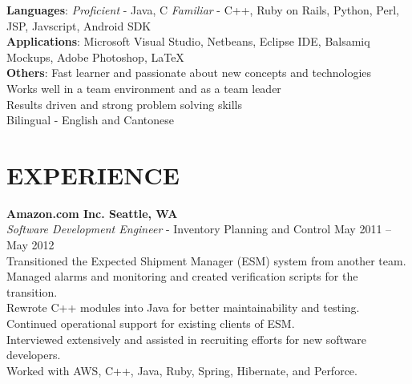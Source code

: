 \documentclass[margin,line]{resume}
\begin{document}
\begin{resume}
    \textbf{Languages}: \textsl{Proficient} - Java, C  \textsl{Familiar} - C++, Ruby on Rails, Python, Perl, JSP, Javscript, Android SDK\\
    \textbf{Applications}: Microsoft Visual Studio, Netbeans, Eclipse IDE, Balsamiq Mockups, Adobe Photoshop, \LaTeX\\
    \textbf{Others}: Fast learner and passionate about new concepts and technologies\\
      \hspace*{\identsize} Works well in a team environment and as a team leader\\
      \hspace*{\identsize} Results driven and strong problem solving skills\\
      \hspace*{\identsize} Bilingual - English and Cantonese

\sectionline

    \section{\mysidestyle \textbf{\large{E}\small{XPERIENCE}}}

    \textbf{\listing Amazon.com Inc. \hfill Seattle, WA}\\
    \textsl{Software Development Engineer} - Inventory Planning and Control \hfill May 2011 -- May 2012\\
      \hspace*{\identsize} Transitioned the Expected Shipment Manager (ESM) system from another team.\\
      \hspace*{\identsize} Managed alarms and monitoring and created verification scripts for the transition.\\
      \hspace*{\identsize} Rewrote C++ modules into Java for better maintainability and testing.\\
      \hspace*{\identsize} Continued operational support for existing clients of ESM.\\
      \hspace*{\identsize} Interviewed extensively and assisted in recruiting efforts for new software developers.\\
      \hspace*{\identsize} Worked with AWS, C++, Java, Ruby, Spring, Hibernate, and Perforce.
    \vspace{-2mm}


\end{resume}
\end{document}
